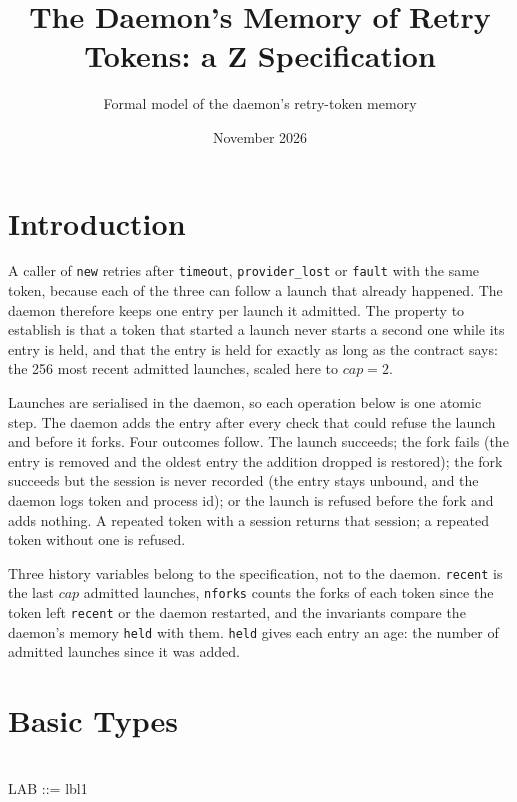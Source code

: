 \documentclass[a4paper,10pt,fleqn]{article}
\begin{document}
\title{The Daemon's Memory of Retry Tokens: a Z Specification}
\author{Formal model of the daemon's retry-token memory}
\date{November 2026}
\maketitle

\section{Introduction}

A caller of \texttt{new} retries after \texttt{timeout}, \texttt{provider\_lost}
or \texttt{fault} with the same token, because each of the three can follow a
launch that already happened.  The daemon therefore keeps one entry per launch
it admitted.  The property to establish is that a token that started a launch
never starts a second one while its entry is held, and that the entry is held
for exactly as long as the contract says: the 256 most recent admitted
launches, scaled here to $cap = 2$.

Launches are serialised in the daemon, so each operation below is one atomic
step.  The daemon adds the entry after every check that could refuse the launch
and before it forks.  Four outcomes follow.  The launch succeeds; the fork
fails (the entry is removed and the oldest entry the addition dropped is
restored); the fork succeeds but the session is never recorded (the entry stays
unbound, and the daemon logs token and process id); or the launch is refused
before the fork and adds nothing.  A repeated token with a session returns that
session; a repeated token without one is refused.

Three history variables belong to the specification, not to the daemon.
\texttt{recent} is the last $cap$ admitted launches, \texttt{nforks} counts the
forks of each token since the token left \texttt{recent} or the daemon
restarted, and the invariants compare the daemon's memory \texttt{held} with
them.  \texttt{held} gives each entry an age: the number of admitted launches
since it was added.

\section{Basic Types}

\begin{zed}
  [TOK] \\
  LAB ::= lbl1
\end{zed}
\end{document}
